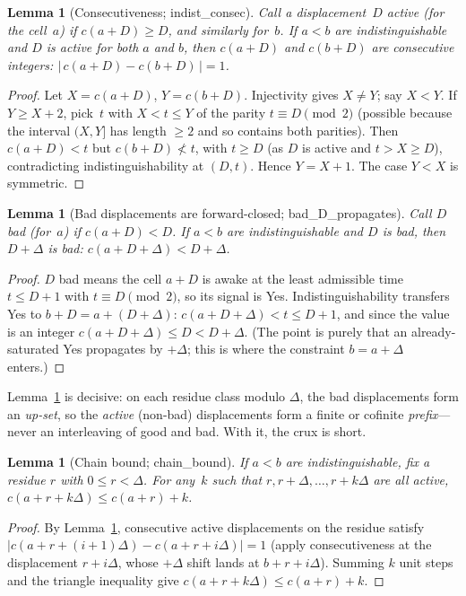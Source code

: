 \documentclass{article}
\newtheorem{lemma}[theorem]{Lemma}
\newcommand{\Yes}{\textsf{Yes}}
\newcommand{\us}{\discretionary{}{}{}\_\discretionary{}{}{}}
\newcommand{\lean}[1]{{\small\ttfamily #1}}
\begin{document}
\begin{lemma}[Consecutiveness; \lean{indist\us consec}]\label{lem:consec}
Call a displacement~$D$ \emph{active} (for the cell~$a$) if
$c(a+D)\ge D$, and similarly for~$b$. If $a<b$ are indistinguishable and
$D$ is active for both $a$ and $b$, then $c(a+D)$ and $c(b+D)$ are
consecutive integers: $|\,c(a+D) - c(b+D)\,| = 1$.
\end{lemma}
\begin{proof}
Let $X=c(a+D)$, $Y=c(b+D)$. Injectivity gives $X\neq Y$; say $X<Y$. If
$Y\ge X+2$, pick~$t$ with $X<t\le Y$ of the parity $t\equiv D\pmod 2$
(possible because the interval $(X,Y]$ has length $\ge 2$ and so contains
both parities). Then $c(a+D)<t$ but $c(b+D)\not<t$, with $t\ge D$ (as $D$
is active and $t>X\ge D$), contradicting indistinguishability at $(D,t)$.
Hence $Y=X+1$. The case $Y<X$ is symmetric.
\end{proof}

\begin{lemma}[Bad displacements are forward-closed;
  \lean{bad\us D\us propagates}]\label{lem:badprop}
Call $D$ \emph{bad} (for~$a$) if $c(a+D) < D$. If $a<b$ are
indistinguishable and $D$ is bad, then $D+\Delta$ is bad:
$c(a+D+\Delta) < D+\Delta$.
\end{lemma}
\begin{proof}
$D$ bad means the cell $a+D$ is awake at the least admissible time
$t\le D+1$ with $t\equiv D \pmod 2$, so its signal is \Yes.
Indistinguishability transfers \Yes{} to $b+D = a+(D+\Delta)$:
$c(a+D+\Delta) < t \le D+1$, and since the value is an integer
$c(a+D+\Delta)\le D < D+\Delta$. (The point is purely that an
already-saturated \Yes{} propagates by $+\Delta$; this is where the
constraint $b=a+\Delta$ enters.)
\end{proof}

Lemma~\ref{lem:badprop} is decisive: on each residue class modulo
$\Delta$, the bad displacements form an \emph{up-set}, so the
\emph{active} (non-bad) displacements form a finite or cofinite
\emph{prefix}---never an interleaving of good and bad. With it, the crux
is short.

\begin{lemma}[Chain bound; \lean{chain\us bound}]\label{lem:chain}
If $a<b$ are indistinguishable, fix a residue $r$ with $0\le r<\Delta$.
For any~$k$ such that $r, r+\Delta, \dots, r+k\Delta$ are all active,
$c(a + r + k\Delta) \le c(a+r) + k$.
\end{lemma}
\begin{proof}
By Lemma~\ref{lem:consec}, consecutive active displacements on the
residue satisfy $|c(a + r + (i{+}1)\Delta) - c(a + r + i\Delta)| = 1$
(apply consecutiveness at the displacement $r+i\Delta$, whose
$+\Delta$ shift lands at $b + r + i\Delta$). Summing $k$ unit steps and
the triangle inequality give $c(a+r+k\Delta)\le c(a+r)+k$.
\end{proof}
\end{document}
